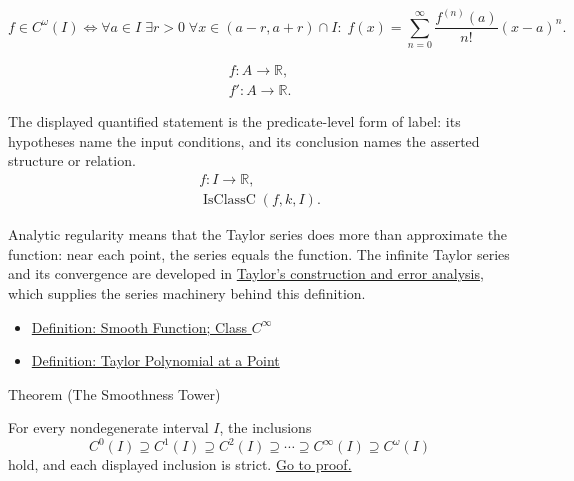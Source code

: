 \begin{remark*}
\[
  f\in C^\omega(I)
  \Longleftrightarrow
  \forall a\in I\;\exists r>0\;\forall x\in(a-r,a+r)\cap I:\;
  f(x)=\sum_{n=0}^{\infty}\frac{f^{(n)}(a)}{n!}(x-a)^n.
\]
\end{remark*}

\begin{remark*}
\[
\begin{aligned}
  f\colon A\to\mathbb{R},\\
  f'\colon A\to\mathbb{R}.
\end{aligned}
\]

The displayed quantified statement is the predicate-level form of label: its hypotheses name the input conditions, and its conclusion names the asserted structure or relation.
\[
\begin{aligned}
  f\colon I\to\mathbb{R},\\
  \operatorname{IsClassC}(f,k,I).
\end{aligned}
\]
\end{remark*}

\begin{remark*}[Interpretation]
Analytic regularity means that the Taylor series does more than approximate the function: near each point, the series equals the function. The infinite Taylor series and its convergence are developed in \hyperref[def:taylor-polynomial-at-a-point]{Taylor's construction and error analysis}, which supplies the series machinery behind this definition.
\end{remark*}

\begin{dependencies}
\begin{itemize}
  \item \hyperref[def:class-cinfty]{Definition: Smooth Function; Class \(C^\infty\)}
  \item \hyperref[def:taylor-polynomial-at-a-point]{Definition: Taylor Polynomial at a Point}
\end{itemize}
\end{dependencies}

\begin{theorembox}{Theorem (The Smoothness Tower)}
\begin{theorem}
\label{thm:smoothness-tower}
For every nondegenerate interval \(I\), the inclusions
\[
  C^0(I)\supseteq C^1(I)\supseteq C^2(I)\supseteq \cdots
  \supseteq C^\infty(I)\supseteq C^\omega(I)
\]
hold, and each displayed inclusion is strict.
\hyperref[prf:smoothness-tower]{Go to proof.}
\end{theorem}
\end{theorembox}

